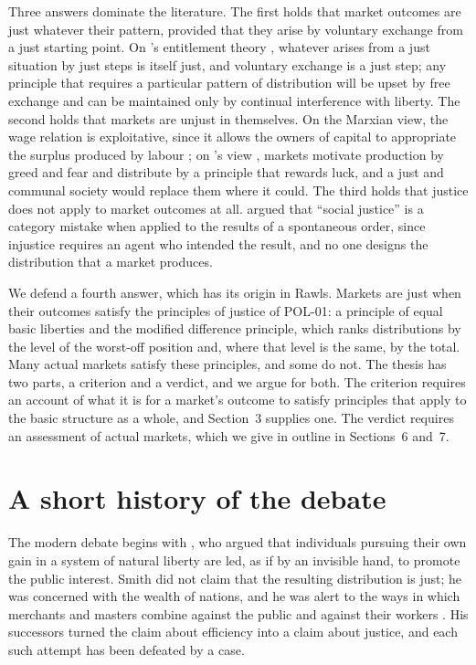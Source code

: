 \documentclass{situationist-preprint}
\begin{document}
Three answers dominate the literature. The first holds that market outcomes are just whatever their pattern, provided that they arise by voluntary exchange from a just starting point. On \citeauthor{Nozick1974}'s entitlement theory \citeyearpar{Nozick1974}, whatever arises from a just situation by just steps is itself just, and voluntary exchange is a just step; any principle that requires a particular pattern of distribution will be upset by free exchange and can be maintained only by continual interference with liberty. The second holds that markets are unjust in themselves. On the Marxian view, the wage relation is exploitative, since it allows the owners of capital to appropriate the surplus produced by labour \citep{Marx1867}; on \citeauthor{Cohen2009}'s view \citeyearpar{Cohen2009}, markets motivate production by greed and fear and distribute by a principle that rewards luck, and a just and communal society would replace them where it could. The third holds that justice does not apply to market outcomes at all. \citet{Hayek1976} argued that \enquote{social justice} is a category mistake when applied to the results of a spontaneous order, since injustice requires an agent who intended the result, and no one designs the distribution that a market produces.

We defend a fourth answer, which has its origin in Rawls. Markets are just when their outcomes satisfy the principles of justice of POL-01: a principle of equal basic liberties and the modified difference principle, which ranks distributions by the level of the worst-off position and, where that level is the same, by the total. Many actual markets satisfy these principles, and some do not. The thesis has two parts, a criterion and a verdict, and we argue for both. The criterion requires an account of what it is for a market's outcome to satisfy principles that apply to the basic structure as a whole, and Section~3 supplies one. The verdict requires an assessment of actual markets, which we give in outline in Sections~6 and~7.

\section{A short history of the debate}

The modern debate begins with \citet{Smith1776}, who argued that individuals pursuing their own gain in a system of natural liberty are led, as if by an invisible hand, to promote the public interest. Smith did not claim that the resulting distribution is just; he was concerned with the wealth of nations, and he was alert to the ways in which merchants and masters combine against the public and against their workers \citep[I.viii, I.x]{Smith1776}. His successors turned the claim about efficiency into a claim about justice, and each such attempt has been defeated by a case.
\end{document}
